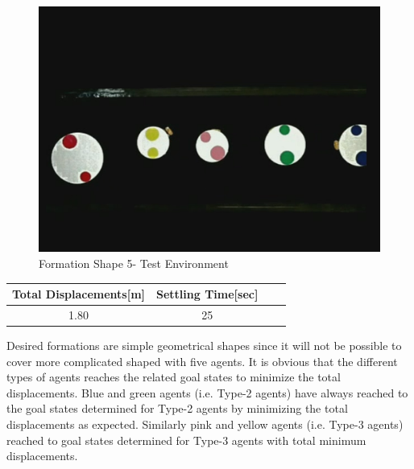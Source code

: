 \begin{figure}[H]
\caption{Formation Shape 5- Test Environment}
\centerline{\includegraphics[scale = 0.35]{9_real_hardware}}
\end{figure} 
					
\begin{center}
 \label{hardwareshape5_ref} 
\begin{tabular}{||c| c |c |c ||}
\hline
\textbf{Total Displacements[m]}  & \textbf{Settling Time[sec]}\\ 
\hline
1.80 & 25 \\
\hline
\end{tabular}
\end{center}

Desired formations are simple geometrical shapes since it will not be possible to cover more complicated shaped with five agents. It is obvious that the different types of agents reaches the related goal states to minimize the total displacements. Blue and green agents (i.e. Type-2 agents) have always reached to the goal states determined for Type-2 agents by minimizing the total displacements as expected. Similarly pink and yellow agents (i.e. Type-3 agents) reached to goal states determined for Type-3 agents with total minimum displacements. 